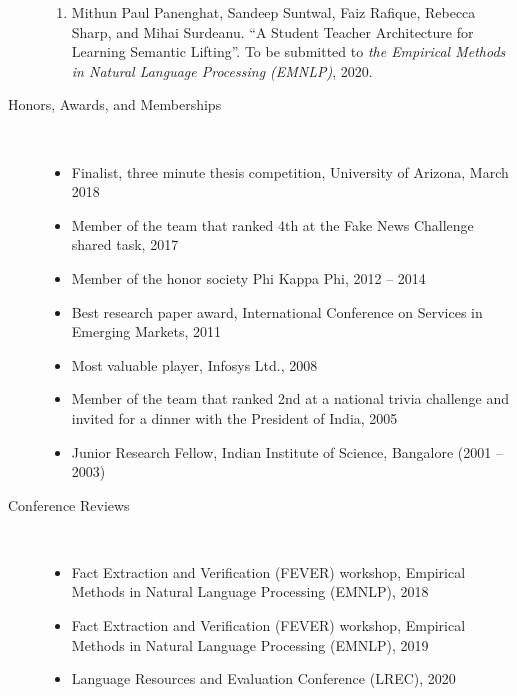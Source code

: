 \documentclass[10pt]{article}
\newcommand{\ve}[1]{{\em #1}} %
\newcommand{\ti}[1]{``#1''} %
\begin{document}
\begin{description}
\begin{enumerate}
\item Mithun Paul Panenghat, Sandeep Suntwal, Faiz Rafique, Rebecca Sharp, and Mihai Surdeanu.   \ti{A Student Teacher Architecture for Learning Semantic Lifting}. To be submitted to \ve {the Empirical Methods in Natural Language Processing (EMNLP)}, 2020.

\end{enumerate}



\bigskip

\vspace{-.3cm}
\item [Honors, Awards, and Memberships]\
\begin{itemize}
\itemsep-1em 
\item Finalist, three minute thesis competition, University of Arizona, March 2018\\

\item Member of the team that ranked 4th at the Fake News Challenge shared task, 2017\\
\item Member of the honor society Phi Kappa Phi, 2012 -- 2014\\
\item Best research paper award, International Conference on Services in Emerging Markets, 2011\\
\item Most valuable player,  Infosys  Ltd., 2008\\
\item Member of the team that ranked 2nd at a national trivia challenge and invited for a dinner with the President of India, 2005\\
\item Junior Research Fellow, Indian Institute of Science, Bangalore (2001 – 2003)\\

\end{itemize}


\vspace{-.4cm}\item [Conference Reviews]\ 
\begin{itemize}
\itemsep-1em 
\item Fact Extraction and Verification (FEVER) workshop, Empirical Methods in Natural Language Processing (EMNLP), 2018\\
\item Fact Extraction and Verification (FEVER) workshop, Empirical Methods in Natural Language Processing (EMNLP), 2019\\
\item Language Resources and Evaluation Conference (LREC), 2020\\


\end{itemize}
\end{description}
\end{document}
